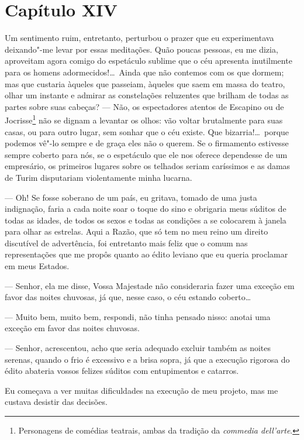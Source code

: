 \section*{Capítulo XIV}

 Um sentimento ruim, entretanto, perturbou o prazer que eu experimentava
deixando"-me levar por essas meditações. Quão poucas pessoas, eu me
dizia, aproveitam agora comigo do espetáculo sublime que o céu
apresenta inutilmente para os homens adormecidos!\ldots\ Ainda que não
contemos com os que dormem; mas que custaria àqueles que passeiam,
àqueles que saem em massa do teatro, olhar um instante e admirar as
constelações reluzentes que brilham de todas as partes sobre suas
cabeças? --- Não, os espectadores atentos de Escapino ou de
Jocrisse\footnote{ Personagens de comédias teatrais, ambas da tradição
da \textit{commedia dell’arte}.} não se dignam a levantar os olhos:
vão voltar brutalmente para suas casas, ou para outro lugar, sem sonhar
que o céu existe. Que bizarria!\ldots\ porque podemos vê"-lo sempre e de
graça eles não o querem. Se o firmamento estivesse sempre coberto para
nós, se o espetáculo que ele nos oferece dependesse de um empresário,
os primeiros lugares sobre os telhados seriam caríssimos e as damas de
Turim disputariam violentamente minha lucarna.

 --- Oh! Se fosse soberano de um país, eu gritava, tomado de uma justa
indignação, faria a cada noite soar o toque do sino e obrigaria meus
súditos de todas as idades, de todos os sexos e todas as condições a se
colocarem à janela para olhar as estrelas. Aqui a Razão, que só tem no
meu reino um direito discutível de advertência, foi entretanto mais
feliz que o comum nas representações que me propôs quanto ao édito
leviano que eu queria proclamar em meus Estados. 

--- Senhor, ela me disse, Vossa Majestade não consideraria fazer uma
exceção em favor das noites chuvosas, já que, nesse caso, o céu estando
coberto\ldots\ 

--- Muito bem, muito bem, respondi, não tinha pensado nisso: anotai uma
exceção em favor das noites chuvosas. 

--- Senhor, acrescentou, acho que seria adequado excluir também as
noites serenas, quando o frio é excessivo e a brisa sopra, já que a
execução rigorosa do édito abateria vossos felizes súditos com
entupimentos e catarros. 

Eu começava a ver muitas dificuldades na execução de meu projeto, mas me
custava desistir das decisões. 

